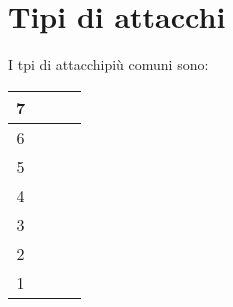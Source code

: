 \chapter{Tipi di attacchi}	 %

I tpi di attacchipiù comuni sono:\\

\begin{tabular}{|c|c|c|c|}
	\hline 
	7&  &  &  \\ 
	\hline 
	6&  &  &  \\ 
	\hline 
	5&  &  &  \\ 
	\hline 
	4&  &  &  \\ 
	\hline 
	3&  &  &  \\ 
	\hline 
	2&  &  &  \\ 
	\hline 
	1&  &  &  \\ 
	\hline 
\end{tabular} 